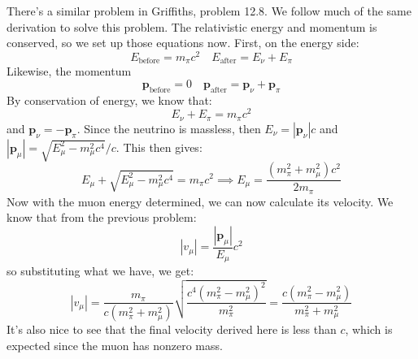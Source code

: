 \documentclass[10pt]{article}
\begin{document}
	\begin{solution}
		There's a similar problem in Griffiths, problem 12.8. We follow much of the same derivation to solve
		this problem. The relativistic energy and momentum is conserved, so we set up those equations now.
		First, on the energy side:
		\[
			E_\text{before} = m_{\pi}c^2 \quad E_\text{after} = E_{\nu} + E_{\pi}
		\]
		Likewise, the momentum
		\[
			\mathbf{p}_\text{before} = 0 \quad \mathbf{p}_\text{after} = \mathbf{p}_{\nu} + \mathbf{p}_{\pi}
		\]
		By conservation of energy, we know that:
		\[
			E_{\nu} + E_{\pi} = m_{\pi}c^2
		\]
		and \( \mathbf{p}_{\nu} = \mathbf{-p}_{\pi} \). Since the neutrino is massless, then \( E_{\nu} =
		|\mathbf{p}_{\nu}|c \) and \( |\mathbf{p}_{\mu}| = \sqrt{E_{\mu}^2 - m_{\mu}^2 c^{4}} / c \). This
		then gives:
		\[
			E_{\mu} + \sqrt{E_{\mu}^2 - m_{\mu}^2 c^{4}} = m_{\pi}c^2 \implies E_{\mu} = \frac{(m_{\pi}^2 +
			m_{\mu}^2)c^2}{2 m_{\pi}}
		\]
		Now with the muon energy determined, we can now calculate its velocity. We know that from the
		previous problem:
		\[
			|v_{\mu}| = \frac{|\mathbf{p}_{\mu}|}{E_{\mu}}c^2
		\]
		so substituting what we have, we get:
		\[
			|v_{\mu}| = \frac{m_\pi}{c (m_\pi^2 + m_\mu^2)} \sqrt{\frac{c^{4}(m_\pi^2 - m_\mu^2)^2}{m_\pi^2}}
			= \frac{c(m_\pi^2 - m_\mu^2)}{m_\pi^2 + m_\mu^2}
		\]
		It's also nice to see that the final velocity derived here is less than \( c \), which is expected
		since the muon has nonzero mass. 
	\end{solution}
\end{document}
